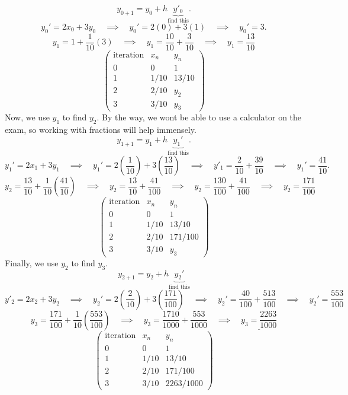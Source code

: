 \documentclass[a4paper,12pt]{article} %
\begin{document}
 $$ y_{0+1} = y_0 + h\underbrace{y'_0}_{\text{find this}}. $$
 $$ y_0' = 2x_0 + 3y_0 \quad\implies\quad y_0' = 2(0) + 3(1) \quad\implies\quad y_0' = 3. $$
 $$ y_1 = 1 + \frac{1}{10}(3) \quad\implies\quad y_1 = \frac{10}{10} + \frac{3}{10} \quad\implies\quad \boxed{y_1 = \frac{13}{10}} $$
 $$ 
\left(\begin{matrix}
 	\text{iteration} & x_n & y_n \\
 	0 & 0 & 1 \\
 	1 & 1/10 & 13/10 \\
 	2 & 2/10 & y_2 \\
 	3 & 3/10 & y_3
\end{matrix}\right)
 $$
 Now, we use $y_1$ to find $y_2$. By the way, we wont be able to use a calculator on the exam, so working with fractions will help immensely.
 $$ y_{1+1} = y_1 + h\underbrace{y_1'}_{\text{find this}}. $$
 $$ y_1' = 2x_1 + 3y_1 \quad\implies\quad y_1' = 2\left(\frac{1}{10}\right) + 3\left(\frac{13}{10}\right) \quad\implies\quad y'_1 = \frac{2}{10} + \frac{39}{10} \quad\implies\quad y_1' = \frac{41}{10}.  $$
 $$ y_2 = \frac{13}{10} + \frac{1}{10}\left(\frac{41}{10}\right) \quad\implies\quad y_2 = \frac{13}{10} + \frac{41}{100} \quad\implies\quad y_2 = \frac{130}{100} + \frac{41}{100} \quad\implies\quad \boxed{y_2 = \frac{171}{100}} $$
  $$ 
\left(\begin{matrix}
 	\text{iteration} & x_n & y_n \\
 	0 & 0 & 1 \\
 	1 & 1/10 & 13/10 \\
 	2 & 2/10 & 171/100 \\
 	3 & 3/10 & y_3
\end{matrix}\right)
 $$
 Finally, we use $y_2$ to find $y_3$.
 $$ y_{2 + 1} = y_2 + h\underbrace{y_2'}_{\text{find this}} $$
 $$ y'_2 = 2x_2 + 3y_2 \quad\implies\quad y_2' = 2\left(\frac{2}{10}\right) + 3\left(\frac{171}{100}\right) \quad\implies\quad y_2' = \frac{40}{100} + \frac{513}{100} \quad\implies\quad \boxed{y_2' = \frac{553}{100}} $$
 $$ y_3 = \frac{171}{100} + \frac{1}{10}\left(\frac{553}{100}\right) \quad\implies\quad y_3 = \frac{1710}{1000} + \frac{553}{1000} \quad\implies\quad \underline{\boxed{y_3 = \frac{2263}{1000}}} $$
  $$ 
\left(\begin{matrix}
 	\text{iteration} & x_n & y_n \\
 	0 & 0 & 1 \\
 	1 & 1/10 & 13/10 \\
 	2 & 2/10 & 171/100 \\
 	3 & 3/10 & 2263/1000
\end{matrix}\right)
 $$
\pagebreak
\end{document}
